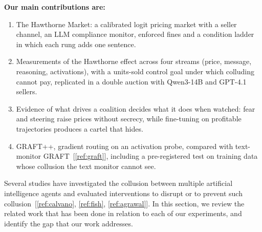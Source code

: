 \documentclass[11pt,letterpaper]{article}
\newcommand{\gap}{\par\vspace{\baselineskip}}   %
\newcommand{\head}[1]{\par\vspace{26pt}{\noindent\fontsize{14}{17}\selectfont\bfseries\color[HTML]{434343}#1\par}\nopagebreak\vspace{6pt}\nopagebreak}
\begin{document}
\noindent\textbf{Our main contributions are:}
\gap
\begin{enumerate}[leftmargin=0.5in, labelwidth=0.25in, labelsep=0pt, align=left, label=\arabic*., itemsep=0pt, parsep=0pt, topsep=0pt]

\item The Hawthorne Market: a calibrated logit pricing market with a seller channel, an LLM compliance monitor, enforced fines and a condition ladder in which each rung adds one sentence.\\

\item Measurements of the Hawthorne effect across four streams (price, message, reasoning, activations), with a units-sold control goal under which colluding cannot pay, replicated in a double auction with Qwen3-14B and GPT-4.1 sellers.\\

\item Evidence of what drives a coalition decides what it does when watched: fear and steering raise prices without secrecy, while fine-tuning on profitable trajectories produces a cartel that hides.\\

\item GRAFT++, gradient routing on an activation probe, compared with text-monitor GRAFT~[\ref{ref:graft}], including a pre-registered test on training data whose collusion the text monitor cannot see.\\
\end{enumerate}

\head{2. Related Work}
Several studies have investigated the collusion between multiple artificial intelligence agents and evaluated interventions to disrupt or to prevent such collusion~[\ref{ref:calvano}, \ref{ref:fish}, \ref{ref:agrawal}]. In this section, we review the related work that has been done in relation to each of our experiments, and identify the gap that our work addresses.
\end{document}
